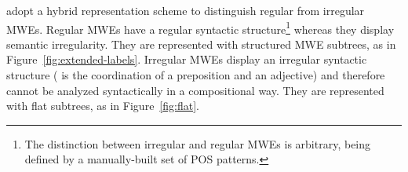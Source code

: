 \documentclass[output=paper]{LSP/langsci}
\begin{document}
\citet{candito2014strategies} adopt a hybrid representation scheme to distinguish regular from irregular MWEs. Regular MWEs have a regular syntactic structure\footnote{The distinction between irregular and regular MWEs is arbitrary, being defined by a manually-built set of POS patterns.} whereas they display semantic irregularity. They are represented with structured MWE subtrees, as in Figure~\ref{fig:extended-labels}. Irregular MWEs display an irregular syntactic structure (\eg{}  is the coordination of a preposition and an adjective) and therefore cannot be analyzed syntactically in a compositional way. They are represented with flat subtrees, as in Figure~\ref{fig:flat}.










\end{document}
